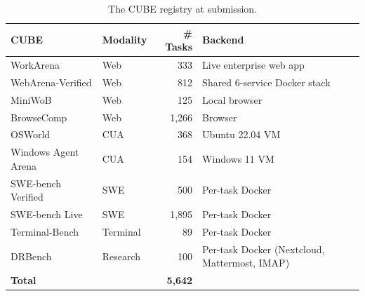 \documentclass{article}
\begin{document}
\begin{table}[h]
\centering
\caption{The CUBE registry at submission.}
\label{tab:cubes}
\footnotesize
\setlength{\tabcolsep}{5pt}
\renewcommand{\arraystretch}{1.05}
\begin{tabular}{llrl}
\toprule
\textbf{CUBE} & \textbf{Modality} & \textbf{\# Tasks} & \textbf{Backend} \\
\midrule
WorkArena            & Web      & 333    & Live enterprise web app \\
WebArena-Verified    & Web      & 812    & Shared 6-service Docker stack \\
MiniWoB              & Web      & 125    & Local browser \\
BrowseComp          & Web      & 1{,}266 & Browser \\
OSWorld              & CUA      & 368    & Ubuntu 22.04 VM \\
Windows Agent Arena  & CUA      & 154    & Windows 11 VM \\
SWE-bench Verified   & SWE      & 500    & Per-task Docker \\
SWE-bench Live       & SWE      & 1{,}895 & Per-task Docker \\
Terminal-Bench        & Terminal & 89     & Per-task Docker \\
DRBench              & Research & 100    & Per-task Docker (Nextcloud, Mattermost, IMAP) \\
\midrule
\textbf{Total}       &          & \textbf{5{,}642} & \\
\bottomrule
\end{tabular}
\end{table}
\end{document}
